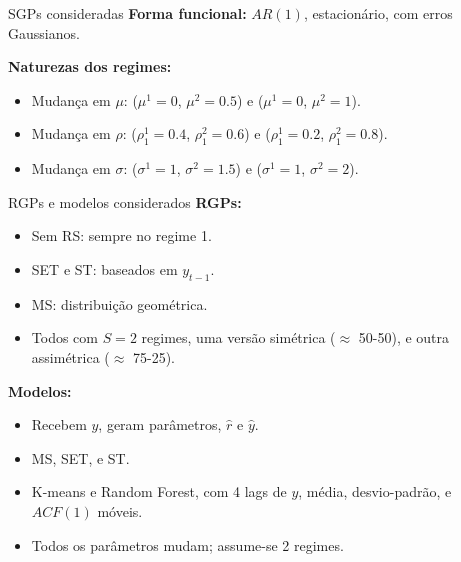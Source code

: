 \documentclass[
  ignorenonframetext,
  brazilian,
]{beamer}
\providecommand{\tightlist}{%
  \setlength{\itemsep}{0pt}\setlength{\parskip}{0pt}}\usepackage{longtable,booktabs,array}
\begin{document}
\begin{frame}{SGPs consideradas}
\label{sgps-consideradas}
\textbf{Forma funcional:} \(AR(1)\), estacionário, com erros Gaussianos.

\pause

\textbf{Naturezas dos regimes:}

\begin{itemize}
\tightlist
\item
  Mudança em \(\mu\): (\(\mu^1 = 0\), \(\mu^2 = 0.5\)) e (\(\mu^1 = 0\),
  \(\mu^2 = 1\)).
\item
  Mudança em \(\rho\): (\(\rho_1^1 = 0.4\), \(\rho_1^2 = 0.6\)) e
  (\(\rho_1^1 = 0.2\), \(\rho_1^2 = 0.8\)).
\item
  Mudança em \(\sigma\): (\(\sigma^1 = 1\), \(\sigma^2 = 1.5\)) e
  (\(\sigma^1 = 1\), \(\sigma^2 = 2\)).
\end{itemize}
\end{frame}

\begin{frame}{RGPs e modelos considerados}
\label{rgps-e-modelos-considerados}
\textbf{RGPs:}

\begin{itemize}
\tightlist
\item
  Sem RS: sempre no regime 1.
\item
  SET e ST: baseados em \(y_{t-1}\).
\item
  MS: distribuição geométrica.
\item
  Todos com \(S = 2\) regimes, uma versão simétrica (\(\approx\) 50-50),
  e outra assimétrica (\(\approx\) 75-25).
\end{itemize}

\pause

\textbf{Modelos:}

\begin{itemize}
\tightlist
\item
  Recebem \(y\), geram parâmetros, \(\hat{r}\) e \(\hat{y}\).
\item
  MS, SET, e ST.
\item
  K-means e Random Forest, com 4 lags de \(y\), média, desvio-padrão, e
  \(ACF(1)\) móveis.
\item
  Todos os parâmetros mudam; assume-se 2 regimes.
\end{itemize}
\end{frame}
\end{document}
